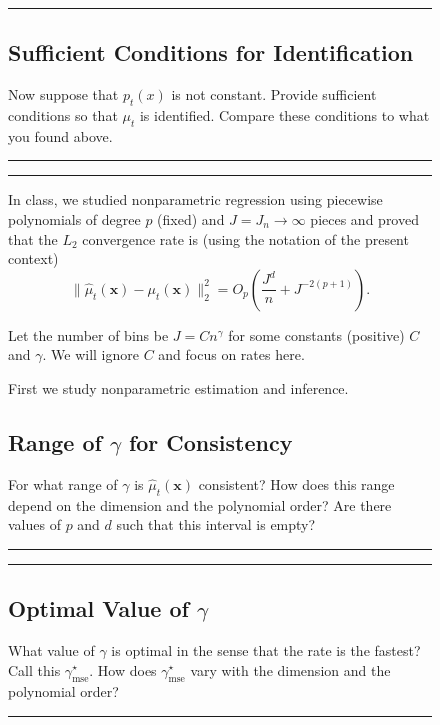 \documentclass{article}
\newenvironment{colorparagraph}[1]{\par\color{#1}}{\par}
\begin{document}
\begin{figure}[H]
  \begin{colorparagraph}{questioncolor}
  \rule{\textwidth}{0.5pt}
  \label{q1b}
  \subsection{Sufficient Conditions for Identification}
  
  Now suppose that \( p_t(x) \) is not constant. Provide sufficient conditions so that \( \mu_t \) is identified. Compare these conditions to what you found above.
  
  \rule{\textwidth}{0.5pt}
  \end{colorparagraph}
\end{figure}
  
\begin{figure}[H]
  \begin{colorparagraph}{questioncolor}
  \rule{\textwidth}{0.5pt}
  In class, we studied nonparametric regression using piecewise polynomials of degree \( p \) (fixed) and \( J = J_n \to \infty \) pieces and proved that the \( L_2 \) convergence rate is (using the notation of the present context)
  \[
  \|\hat{\mu}_t(\mathbf{x}) - \mu_t(\mathbf{x})\|_2^2 = O_p\left( \frac{J^d}{n} + J^{-2(p+1)} \right).
  \]

  Let the number of bins be \( J = C n^\gamma \) for some constants (positive) \( C \) and \( \gamma \). We will ignore \( C \) and focus on rates here.

  First we study nonparametric estimation and inference.

  \label{q1c}
  \subsection{Range of \(\gamma\) for Consistency}

  For what range of \( \gamma \) is \( \hat{\mu}_t(\mathbf{x}) \) consistent? How does this range depend on the dimension and the polynomial order? Are there values of \( p \) and \( d \) such that this interval is empty?
  
  \rule{\textwidth}{0.5pt}
  \end{colorparagraph}
\end{figure}
  
\begin{figure}[H]
  \begin{colorparagraph}{questioncolor}
  \rule{\textwidth}{0.5pt}
  \label{q1d}
  \subsection{Optimal Value of \(\gamma\)}
  
  What value of \( \gamma \) is optimal in the sense that the rate is the fastest? Call this \( \gamma^\star_{\text{mse}} \). How does \( \gamma^\star_{\text{mse}} \) vary with the dimension and the polynomial order?
  
  \rule{\textwidth}{0.5pt}
  \end{colorparagraph}
\end{figure}
  
\end{document}
